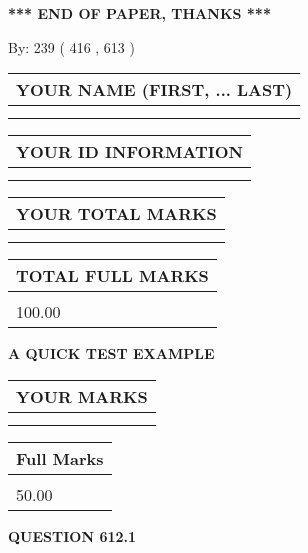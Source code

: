 \documentclass[12pt]{article}
\begin{document}
\vspace{1.0in} 
{\textbf{\large{ *** END OF PAPER, THANKS *** }}} 
   
   
\hspace{1.0in} By: 
 239 ( 416 ,  613 )
   
   
   
   
\newpage 
\setcounter{page}{ 
   612001 } 
   
   
   
   
\noindent\begin{tabular}{|l|}
\hline
YOUR NAME (FIRST, ... LAST)  \\
\hline
 \\ 
 \\ 
\hline
\end{tabular}
\hspace{0.05in} \begin{tabular}{|l|}
\hline
 YOUR   ID   INFORMATION  \\
\hline
 \\ 
 \\ 
\hline
\end{tabular}
   
   
\vspace{0.2in}\noindent\begin{tabular}{|l|}
\hline
YOUR TOTAL MARKS  \\
\hline
 \\ 
 \\ 
\hline
\end{tabular}
\hspace{0.05in} \begin{tabular}{|l|}
\hline
TOTAL FULL MARKS  \\
\hline
 \\ 
100.00 \\
\hline
\end{tabular}
   
   
 \vspace{0.2in}
{\LARGE {\textbf{ A QUICK TEST EXAMPLE}}}
   
   
  
\vspace{0.2in}
  
\noindent\begin{tabular}{|l|}
\hline
 YOUR MARKS  \\
\hline
 \\ 
 \\ 
\hline
\end{tabular}
\hspace{0.05in} \begin{tabular}{|l|}
\hline
 Full Marks  \\
\hline
 \\ 
50.00 \\
\hline
\end{tabular}
{\textbf{\Large{QUESTION
612.1 
}}}
  
\end{document}
